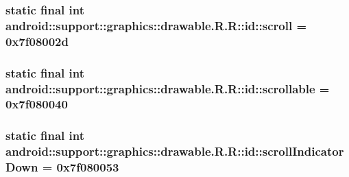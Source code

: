 \hypertarget{classandroid_1_1support_1_1graphics_1_1drawable_1_1_r_1_1id_25204cee2d30e30feefcc3b1936bd91b}{
\subsubsection[{scroll}]{\setlength{\rightskip}{0pt plus 5cm}static final int android::support::graphics::drawable.R.R::id::scroll = 0x7f08002d}}
\label{classandroid_1_1support_1_1graphics_1_1drawable_1_1_r_1_1id_25204cee2d30e30feefcc3b1936bd91b}


\hypertarget{classandroid_1_1support_1_1graphics_1_1drawable_1_1_r_1_1id_6410ff1bd6be1de24b3e23463a7aa1cc}{
\subsubsection[{scrollable}]{\setlength{\rightskip}{0pt plus 5cm}static final int android::support::graphics::drawable.R.R::id::scrollable = 0x7f080040}}
\label{classandroid_1_1support_1_1graphics_1_1drawable_1_1_r_1_1id_6410ff1bd6be1de24b3e23463a7aa1cc}


\hypertarget{classandroid_1_1support_1_1graphics_1_1drawable_1_1_r_1_1id_87b2a046a127c7f9b443fffa6b98b78f}{
\subsubsection[{scrollIndicatorDown}]{\setlength{\rightskip}{0pt plus 5cm}static final int android::support::graphics::drawable.R.R::id::scrollIndicatorDown = 0x7f080053}}
\label{classandroid_1_1support_1_1graphics_1_1drawable_1_1_r_1_1id_87b2a046a127c7f9b443fffa6b98b78f}


